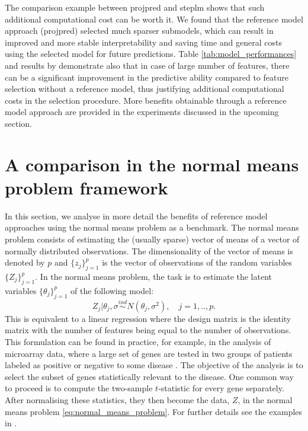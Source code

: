 \documentclass[american,]{article}
\theoremstyle{definition}
\begin{document}
The comparison example between projpred and steplm shows that such
additional computational cost can be worth it. We found that the
reference model approach (projpred) selected much sparser submodels,
which can result in improved and more stable interpretability and
saving time and general costs using the selected model for future
predictions. Table \ref{tab:model_performances} and results by
\citet{paper:model_selection} demonstrate also that in case of large
number of features, there can be a significant improvement in the
predictive ability compared to feature selection without a reference
model, thus justifying additional computational costs in the selection
procedure. More benefits obtainable through a reference model approach
are provided in the experiments discussed in the upcoming section.


\hypertarget{comparison}{%
\section{A comparison in the normal means problem framework}\label{comparison}}

In this section, we analyse in more detail the benefits of reference
model approaches using the normal means problem as a benchmark. The
normal means problem consists of estimating the (usually sparse)
vector of means of a vector of normally distributed observations. The
dimensionality of the vector of means is denoted by $p$ and
$\{z_{j}\}_{j=1}^{p}$ is the vector of observations of the random
variables $\{Z_{j}\}_{j=1}^{p}$. In the normal means problem, the task
is to estimate the latent variables $\{\theta_{j}\}_{j=1}^{p}$ of the
following model: \
\begin{equation}\label{eq:normal_means_problem}
Z_{j}|\theta_{j},\sigma\overset{ind}{\sim}N(\theta_{j},\sigma^{2}), \quad j=1,..,p.
\end{equation}
This is equivalent to a linear regression where the design matrix is
the identity matrix with the number of features being equal to the
number of observations. This formulation can be found in practice, for
example, in the analysis of microarray data, where a large set of
genes are tested in two groups of patients labeled as positive or
negative to some disease \citep{paper:efron,efron2012large}. The
objective of the analysis is to select the subset of genes
statistically relevant to the disease. One common way to proceed is to
compute the two-sample $t$-statistic for every gene separately.  After
normalising these statistics, they then become the data, $Z$, in the
normal means problem \eqref{eq:normal_means_problem}. For further
details see the examples in \cite{paper:efron, efron2012large}.
\end{document}
